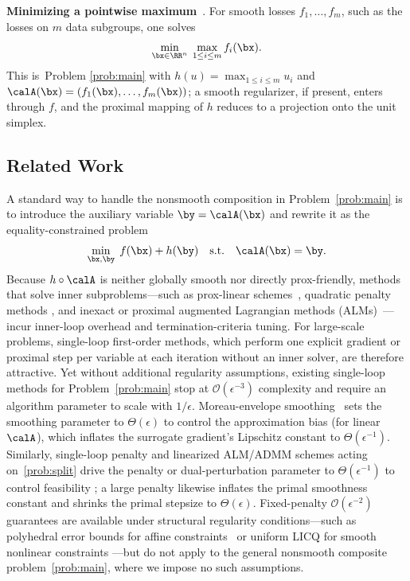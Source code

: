 \textbf{Minimizing a pointwise maximum}~\cite{zhang2020smoothed}.
For smooth losses $f_1,\dots,f_m$, such as the losses on $m$ data subgroups, one solves
\begin{equation*}
  \min_{\bx\in\RR^n}\;\max_{1\le i\le m} f_i(\bx).
\end{equation*}
This is~Problem \eqref{prob:main} with $h(u)=\max_{1\le i\le m}u_i$ and
$\calA(\bx)=(f_1(\bx),\dots,f_m(\bx))$; a smooth regularizer, if present, enters
through $f$, and the proximal mapping of $h$ reduces to a projection onto the unit
simplex.

\subsection{Related Work}

A standard way to handle the nonsmooth composition in Problem~\eqref{prob:main}
is to introduce the auxiliary variable $\by=\calA(\bx)$ and rewrite it as the
equality-constrained problem
\begin{equation}\label{prob:split}
  \min_{\bx,\by}\; f(\bx)+h(\by)\quad\text{s.t.}\quad \calA(\bx)=\by.
\end{equation}
Because $h\circ\calA$ is neither globally smooth nor directly prox-friendly,
methods that solve inner subproblems---such as prox-linear
schemes~\cite{Drusvyatskiy2019}, quadratic penalty methods
\cite{kong2019complexity,lin2022complexity}, and inexact or proximal augmented
Lagrangian methods (ALMs)~\cite{sahin2019inexact,li2021rate,xie2021proximal}---incur
inner-loop overhead and termination-criteria tuning. For large-scale problems,
single-loop first-order methods, which perform one explicit gradient or
proximal step per variable at each iteration without an inner solver, are
therefore attractive. Yet without additional regularity assumptions, existing
single-loop methods for Problem~\eqref{prob:main} stop at $\mathcal O(\epsilon^{-3})$
complexity and require an algorithm parameter to scale with $1/\epsilon$.
Moreau-envelope smoothing~\cite{bohm2021variable} sets the smoothing parameter
to $\Theta(\epsilon)$ to control the approximation bias (for linear $\calA$),
which inflates the surrogate gradient's Lipschitz constant to $\Theta(\epsilon^{-1})$.
Similarly, single-loop penalty and linearized ALM/ADMM schemes acting
on~\eqref{prob:split} drive the penalty or dual-perturbation parameter to
$\Theta(\epsilon^{-1})$ to control feasibility
\cite{hajinezhad2019perturbed,luSingleLoopGradientDescent2022,hallak2023adaptive,alacaoglu2024complexity,sun2024dual_descent_alm_admm,elbourkhissi2025perturbed,shi2025momentum};
a large penalty likewise inflates the primal smoothness constant and shrinks
the primal stepsize to $\Theta(\epsilon)$. Fixed-penalty $\mathcal O(\epsilon^{-2})$
guarantees are available under structural regularity conditions---such as
polyhedral error bounds for affine constraints~\cite{zhang2022global} or
uniform LICQ for smooth nonlinear constraints
\cite{elbourkhissi2025linearized,liu2026fixed}---but do not apply to the
general nonsmooth composite problem~\eqref{prob:main}, where we impose no such
assumptions.

